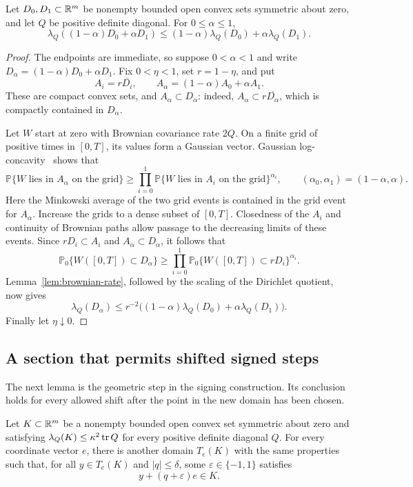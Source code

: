 \begin{lemma}\label{lem:minkowski}
Let $D_0,D_1\subset\mathbb R^m$ be nonempty bounded open convex sets symmetric
about zero, and let $Q$ be positive definite diagonal. For $0\le\alpha\le1$,
\[
 \lambda_Q((1-\alpha)D_0+\alpha D_1)
 \le(1-\alpha)\lambda_Q(D_0)+\alpha\lambda_Q(D_1).
\]
\end{lemma}

\begin{proof}
The endpoints are immediate, so suppose $0<\alpha<1$ and write
$D_\alpha=(1-\alpha)D_0+\alpha D_1$. Fix $0<\eta<1$, set $r=1-\eta$,
and put
\[
 A_i=r\overline{D_i},\qquad
 A_\alpha=(1-\alpha)A_0+\alpha A_1.
\]
These are compact convex sets, and $A_\alpha\subset D_\alpha$: indeed,
$A_\alpha\subset r\overline{D_\alpha}$, which is compactly contained in
$D_\alpha$.

Let $W$ start at zero with Brownian covariance rate $2Q$. On a finite grid
of positive times in $[0,T]$, its values form a Gaussian vector. Gaussian
log-concavity~\cite[Theorem~2]{Prekopa1973} shows that
\[
 \mathbb P\{W\text{ lies in }A_\alpha\text{ on the grid}\}
 \ge\prod_{i=0}^1
 \mathbb P\{W\text{ lies in }A_i\text{ on the grid}\}^{\alpha_i},
 \qquad (\alpha_0,\alpha_1)=(1-\alpha,\alpha).
\]
Here the Minkowski average of the two grid events is contained in the grid
event for $A_\alpha$. Increase the grids to a dense subset of $[0,T]$.
Closedness of the $A_i$ and continuity of Brownian paths allow passage to
the decreasing limits of these events. Since $rD_i\subset A_i$ and
$A_\alpha\subset D_\alpha$, it follows that
\[
 \mathbb P_0\{W([0,T])\subset D_\alpha\}
 \ge\prod_{i=0}^1
 \mathbb P_0\{W([0,T])\subset rD_i\}^{\alpha_i}.
\]
Lemma~\ref{lem:brownian-rate}, followed by the scaling of the Dirichlet
quotient, now gives
\[
 \lambda_Q(D_\alpha)
 \le r^{-2}\bigl((1-\alpha)\lambda_Q(D_0)+\alpha\lambda_Q(D_1)\bigr).
\]
Finally let $\eta\downarrow0$.
\end{proof}

\subsection{A section that permits shifted signed steps}

The next lemma is the geometric step in the signing construction. Its
conclusion holds for every allowed shift after the point in the new domain
has been chosen.

\begin{lemma}\label{lem:shift-section}
Let $K\subset\mathbb R^m$ be a nonempty bounded open convex set symmetric about
zero and satisfying $\lambda_Q(K)\le\kappa^2\operatorname{tr} Q$ for every positive
definite diagonal $Q$. For every coordinate vector $e$, there is another
domain $T_e(K)$ with the same properties such that, for all $y\in T_e(K)$
and $|q|\le\delta$, some $\varepsilon\in\{-1,1\}$ satisfies
\[
 y+(q+\varepsilon)e\in K.
\]
\end{lemma}

